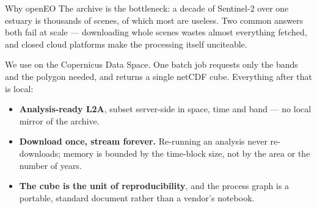 \begin{pblock}{Why openEO}
The archive is the bottleneck: a decade of Sentinel-2 over one estuary is
thousands of scenes, of which most are useless. Two common answers both fail
at scale — downloading whole scenes wastes almost everything fetched, and
closed cloud platforms make the processing itself unciteable.

We use  on the Copernicus Data Space. One batch job requests
only the bands and the polygon needed, and returns a single netCDF cube.
Everything after that is local:

\begin{itemize}
  \item \textbf{Analysis-ready L2A}, subset server-side in space, time and
        band — no local mirror of the archive.
  \item \textbf{Download once, stream forever.} Re-running an analysis never
        re-downloads; memory is bounded by the time-block size, not by the
        area or the number of years.
  \item \textbf{The cube is the unit of reproducibility}, and the process
        graph is a portable, standard document rather than a vendor's
        notebook.
\end{itemize}

\vspace{4mm}
\end{pblock}
